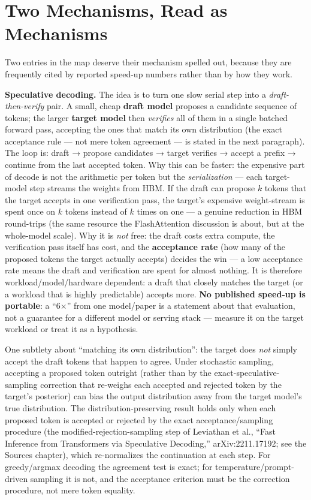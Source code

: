 \section*{Two Mechanisms, Read as
Mechanisms}\label{two-mechanisms-read-as-mechanisms}

Two entries in the map deserve their mechanism spelled out, because they
are frequently cited by reported speed-up numbers rather than by how
they work.

\textbf{Speculative decoding.} The idea is to turn one slow serial step
into a \emph{draft-then-verify} pair. A small, cheap \textbf{draft
model} proposes a candidate sequence of tokens; the larger
\textbf{target model} then \emph{verifies} all of them in a single
batched forward pass, accepting the ones that match its own distribution
(the exact acceptance rule --- not mere token agreement --- is stated in
the next paragraph). The loop is: draft → propose candidates → target
verifies → accept a prefix → continue from the last accepted token. Why
this can be faster: the expensive part of decode is not the arithmetic
per token but the \emph{serialization} --- each target-model step
streams the weights from HBM. If the draft can propose \(k\) tokens that
the target accepts in one verification pass, the target's expensive
weight-stream is spent once on \(k\) tokens instead of \(k\) times on
one --- a genuine reduction in HBM round-trips (the same resource the
FlashAttention discussion is about, but at the whole-model scale). Why
it is \emph{not} free: the draft costs extra compute, the verification
pass itself has cost, and the \textbf{acceptance rate} (how many of the
proposed tokens the target actually accepts) decides the win --- a low
acceptance rate means the draft and verification are spent for almost
nothing. It is therefore workload/model/hardware dependent: a draft that
closely matches the target (or a workload that is highly predictable)
accepts more. \textbf{No published speed-up is portable}: a ``6×'' from
one model/paper is a statement about that evaluation, not a guarantee
for a different model or serving stack --- measure it on the target
workload or treat it as a hypothesis.

One subtlety about ``matching its own distribution'': the target does
\emph{not} simply accept the draft tokens that happen to agree. Under
stochastic sampling, accepting a proposed token outright (rather than by
the exact-speculative-sampling correction that re-weighs each accepted
and rejected token by the target's posterior) can bias the output
distribution away from the target model's true distribution. The
distribution-preserving result holds only when each proposed token is
accepted or rejected by the exact acceptance/sampling procedure (the
modified-rejection-sampling step of Leviathan et al., ``Fast Inference
from Transformers via Speculative Decoding,'' arXiv:2211.17192; see the
Sources chapter), which re-normalizes the continuation at each step. For
greedy/argmax decoding the agreement test is exact; for
temperature/prompt-driven sampling it is not, and the acceptance
criterion must be the correction procedure, not mere token equality.

